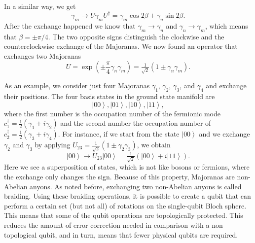 In a similar way, we get
\begin{equation}
\gamma_{m}\to U\gamma_{m}U^{\dagger}=\gamma_{m}\cos2\beta+\gamma_{n}\sin2\beta.
\end{equation}
After the exchange happened we know that $\gamma_{m}\to\gamma_{n}$ and $\gamma_{n}\to\gamma_{m}$, which means that $\beta=\pm\pi/4$.
The two opposite signs distinguish the clockwise and the counterclockwise exchange of the Majoranas.
We now found an operator that exchanges two Majoranas
\begin{equation}
U=\exp\left(\pm\frac{\pi}{4}\gamma_{n}\gamma_{m}\right)=\tfrac{1}{\sqrt{2}}\left(1\pm\gamma_{n}\gamma_{m}\right).\label{eq:U_nm}
\end{equation}

As an example, we consider just four Majoranas $\gamma_{1}$, $\gamma_{2}$, $\gamma_{3}$, and $\gamma_{4}$ and exchange their positions.
The four basis states in the ground state manifold are
\begin{equation}
\left|00\right\rangle ,\left|01\right\rangle ,\left|10\right\rangle ,\left|11\right\rangle ,\label{eq:basis}
\end{equation}
where the first number is the occupation number of the fermionic mode $c_{1}^{\dagger}=\tfrac{1}{2}(\gamma_{1}+i\gamma_{2})$ and the second number the occupation number of $c_{2}^{\dagger}=\tfrac{1}{2}(\gamma_{3}+i\gamma_{4})$.
For instance, if we start from the state $\left|00\right\rangle $ and we exchange $\gamma_{2}$ and $\gamma_{3}$ by applying $U_{23}=\tfrac{1}{\sqrt{2}}\left(1\pm\gamma_{2}\gamma_{3}\right)$, we obtain
\begin{equation}
\left|00\right\rangle \to U_{23}\left|00\right\rangle =\tfrac{1}{\sqrt{2}}\left(\left|00\right\rangle +i\left|11\right\rangle \right).
\end{equation}  %
Here we see a superposition of states, which is not like bosons or fermions, where the exchange only changes the sign.
Because of this property, Majoranas are non-Abelian anyons.
As noted before, exchanging two non-Abelian anyons is called braiding.
Using these braiding operations, it is possible to create a qubit that can perform a certain set (but not all) of rotations on the single-qubit Bloch sphere.
This means that some of the qubit operations are topologically protected.
This reduces the amount of error-correction needed in comparison with a non-topological qubit, and in turn, means that fewer physical qubits are required.


